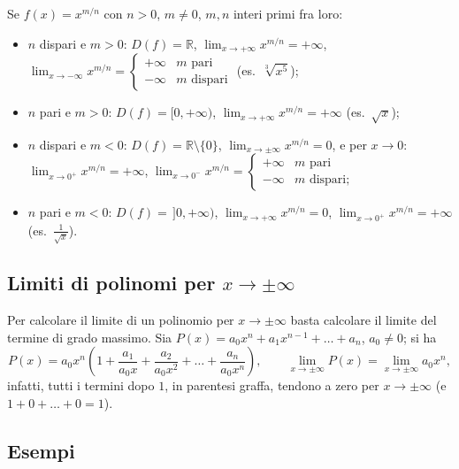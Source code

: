 \documentclass[11pt,a4paper]{article}
\begin{document}
Se $f(x) = x^{m/n}$ con $n > 0$, $m \neq 0$, $m, n$ interi primi fra loro:
\begin{itemize}
    \item $n$ dispari e $m > 0$: $D(f) = \mathbb{R}$, $\displaystyle\lim_{x\to+\infty} x^{m/n} = +\infty$, $\displaystyle\lim_{x\to-\infty} x^{m/n} = \begin{cases} +\infty & m \text{ pari} \\ -\infty & m \text{ dispari} \end{cases}$ \quad (es.\ $\sqrt[3]{x^5}$);
    \item $n$ pari e $m > 0$: $D(f) = [0, +\infty)$, $\displaystyle\lim_{x\to+\infty} x^{m/n} = +\infty$ (es.\ $\sqrt{x}$);
    \item $n$ dispari e $m < 0$: $D(f) = \mathbb{R}\setminus\{0\}$, $\displaystyle\lim_{x\to\pm\infty} x^{m/n} = 0$, e per $x \to 0$: $\displaystyle\lim_{x\to 0^+} x^{m/n} = +\infty$, $\displaystyle\lim_{x\to 0^-} x^{m/n} = \begin{cases} +\infty & m \text{ pari} \\ -\infty & m \text{ dispari;} \end{cases}$
    \item $n$ pari e $m < 0$: $D(f) = \,]0, +\infty)$, $\displaystyle\lim_{x\to+\infty} x^{m/n} = 0$, $\displaystyle\lim_{x\to 0^+} x^{m/n} = +\infty$ (es.\ $\frac{1}{\sqrt x}$).
\end{itemize}

\subsection{Limiti di polinomi per $x \to \pm\infty$}

Per calcolare il limite di un polinomio per $x \to \pm\infty$ basta calcolare il limite del termine di grado massimo. Sia $P(x) = a_0 x^n + a_1 x^{n-1} + \dots + a_n$, $a_0 \neq 0$; si ha
\[
P(x) = a_0 x^n \left( 1 + \frac{a_1}{a_0 x} + \frac{a_2}{a_0 x^2} + \dots + \frac{a_n}{a_0 x^n} \right),
\qquad
\lim_{x\to\pm\infty} P(x) = \lim_{x\to\pm\infty} a_0 x^n ,
\]
infatti, tutti i termini dopo $1$, in parentesi graffa, tendono a zero per $x \to \pm\infty$ (e $1 + 0 + \dots + 0 = 1$).

\subsection{Esempi}
\end{document}
